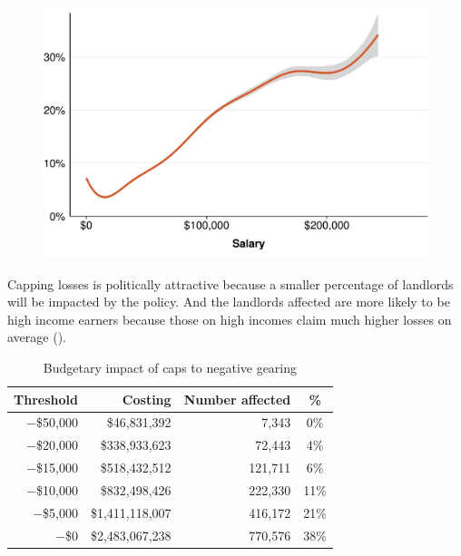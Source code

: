 \documentclass{grattan}\usepackage[]{graphicx}\usepackage[]{color}
\begin{document}
\begin{figure}

\includegraphics[width=\columnwidth]{CGT-NG-atlas//NG-vs-salary-1}
\end{figure}

Capping losses is politically attractive because a smaller percentage of landlords will be impacted by the policy. And the landlords affected are more likely to be high income earners because those on high incomes claim much higher losses on average (). 

\begin{table}
\caption{Budgetary impact of caps to negative gearing}\label{tbl:cap-NG}
\begin{tabularx}{\linewidth}{rrrS}
  \toprule
{\textbf{Threshold}} & {\textbf{Costing}} & {\textbf{Number affected}} & {\textbf{\%}} \\ 
  \midrule
$-$\$50,000 & \$46,831,392 & 7,343 & 0\% \\ 
  $-$\$20,000 & \$338,933,623 & 72,443 & 4\% \\ 
  $-$\$15,000 & \$518,432,512 & 121,711 & 6\% \\ 
  $-$\$10,000 & \$832,498,426 & 222,330 & 11\% \\ 
  $-$\$5,000 & \$1,411,118,007 & 416,172 & 21\% \\ 
  $-$\$0 & \$2,483,067,238 & 770,576 & 38\% \\ 
   \bottomrule
\end{tabularx}

\end{table}
\end{document}
